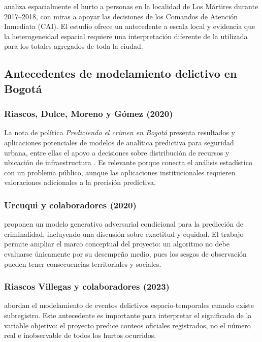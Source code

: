 \documentclass[12pt,letterpaper]{article}
\begin{document}
\citet{fonseca2019} analiza espacialmente el hurto a personas en la localidad de Los Mártires durante 2017--2018, con miras a apoyar las decisiones de los Comandos de Atención Inmediata (CAI). El estudio ofrece un antecedente a escala local y evidencia que la heterogeneidad espacial requiere una interpretación diferente de la utilizada para los totales agregados de toda la ciudad.

\subsection{Antecedentes de modelamiento delictivo en Bogotá}

\subsubsection{Riascos, Dulce, Moreno y Gómez (2020)}

La nota de política \emph{Prediciendo el crimen en Bogotá} presenta resultados y aplicaciones potenciales de modelos de analítica predictiva para seguridad urbana, entre ellas el apoyo a decisiones sobre distribución de recursos y ubicación de infraestructura \citep{riascos2020}. Es relevante porque conecta el análisis estadístico con un problema público, aunque las aplicaciones institucionales requieren valoraciones adicionales a la precisión predictiva.

\subsubsection{Urcuqui y colaboradores (2020)}

\citet{urcuqui2020} proponen un modelo generativo adversarial condicional para la predicción de criminalidad, incluyendo una discusión sobre exactitud y equidad. El trabajo permite ampliar el marco conceptual del proyecto: un algoritmo no debe evaluarse únicamente por su desempeño medio, pues los sesgos de observación pueden tener consecuencias territoriales y sociales.

\subsubsection{Riascos Villegas y colaboradores (2023)}

\citet{riascos2023} abordan el modelamiento de eventos delictivos espacio-temporales cuando existe subregistro. Este antecedente es importante para interpretar el significado de la variable objetivo: el proyecto predice conteos oficiales registrados, no el número real e inobservable de todos los hurtos ocurridos.
\end{document}
